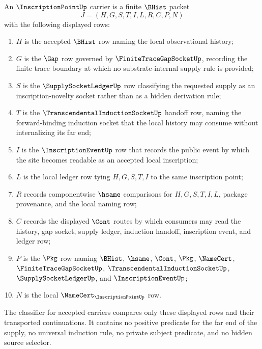 \begin{definition}
\label{def:inscription-point-carrier}
An $\InscriptionPointUp$ carrier is a finite $\BHist$ packet
$$
J=(H,G,S,T,I,L,R,C,P,N)
$$
with the following displayed rows:
\begin{enumerate}
\item $H$ is the accepted $\BHist$ row naming the local observational history;
\item $G$ is the $\Gap$ row governed by $\FiniteTraceGapSocketUp$, recording the finite trace boundary at which no substrate-internal supply rule is provided;
\item $S$ is the $\SupplySocketLedgerUp$ row classifying the requested supply as an inscription-novelty socket rather than as a hidden derivation rule;
\item $T$ is the $\TranscendentalInductionSocketUp$ handoff row, naming the forward-binding induction socket that the local history may consume without internalizing its far end;
\item $I$ is the $\InscriptionEventUp$ row that records the public event by which the site becomes readable as an accepted local inscription;
\item $L$ is the local ledger row tying $H,G,S,T,I$ to the same inscription point;
\item $R$ records componentwise $\hsame$ comparisons for $H,G,S,T,I,L$, package provenance, and the local naming row;
\item $C$ records the displayed $\Cont$ routes by which consumers may read the history, gap socket, supply ledger, induction handoff, inscription event, and ledger row;
\item $P$ is the $\Pkg$ row naming $\BHist$, $\hsame$, $\Cont$, $\Pkg$, $\NameCert$, $\FiniteTraceGapSocketUp$, $\TranscendentalInductionSocketUp$, $\SupplySocketLedgerUp$, and $\InscriptionEventUp$;
\item $N$ is the local $\NameCert_{\InscriptionPointUp}$ row.
\end{enumerate}
The classifier for accepted carriers compares only these displayed rows and their transported continuations. It contains no positive predicate for the far end of the supply, no universal induction rule, no private subject predicate, and no hidden source selector.
\end{definition}

